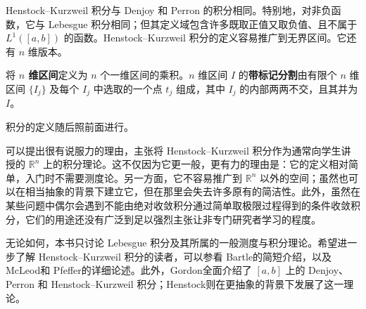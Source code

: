\documentclass[../../main.tex]{subfiles}%
\begin{document}
\begin{remark}
Henstock–Kurzweil 积分与 Denjoy 和 Perron 的积分相同。特别地，对非负函数，它与 Lebesgue 积分相同；但其定义域包含许多既取正值又取负值、且不属于 $L^1([a,b])$ 的函数。Henstock–Kurzweil 积分的定义容易推广到无界区间。它还有 $n$ 维版本。
\end{remark}
\begin{definition}[$n$ 维区间及其带标记分割]\label{definition:ch02-n-interval-tagged-partition}
将 \textbf{$n$ 维区间}定义为 $n$ 个一维区间的乘积。$n$ 维区间 $I$ 的\textbf{带标记分割}由有限个 $n$ 维区间 $\{I_j\}$ 及每个 $I_j$ 中选取的一个点 $t_j$ 组成，其中 $I_j$ 的内部两两不交，且其并为 $I$。
\end{definition}
积分的定义随后照前面进行。

可以提出很有说服力的理由，主张将 Henstock–Kurzweil 积分作为通常向学生讲授的 $\mathbb{R}^n$ 上的积分理论。这不仅因为它更一般，更有力的理由是：它的定义相对简单，入门时不需要测度论。另一方面，它不容易推广到 $\mathbb{R}^n$ 以外的空间；虽然也可以在相当抽象的背景下建立它，但在那里会失去许多原有的简洁性。此外，虽然在某些问题中偶尔会遇到不能由绝对收敛积分通过简单取极限过程得到的条件收敛积分，它们的用途还没有广泛到足以强烈主张让非专门研究者学习的程度。

无论如何，本书只讨论 Lebesgue 积分及其所属的一般测度与积分理论。希望进一步了解 Henstock–Kurzweil 积分的读者，可以参看 Bartle\cite{folland-bib-013}的简短介绍，以及 McLeod\cite{folland-bib-099}和 Pfeffer\cite{folland-bib-109}的详细论述。此外，Gordon\cite{folland-bib-057}全面介绍了 $[a,b]$ 上的 Denjoy、Perron 和 Henstock–Kurzweil 积分；Henstock\cite{folland-bib-072}则在更抽象的背景下发展了这一理论。
\end{document}
